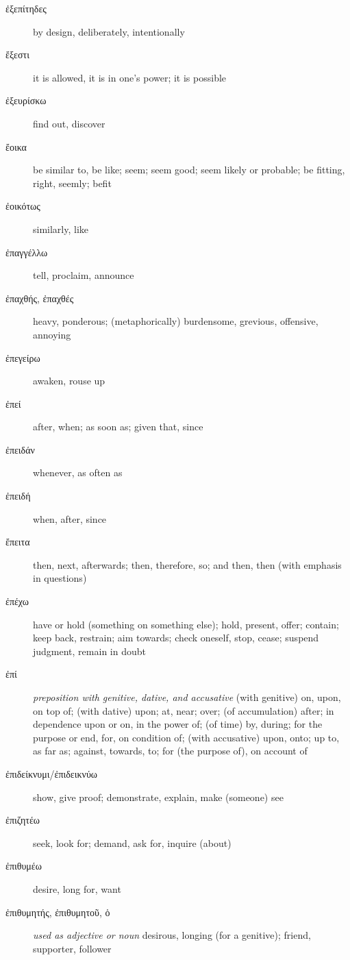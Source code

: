 \documentclass[12pt,letterpaper]{article}
\begin{document}
\begin{description}
    \item[\textgreek{ἐξεπίτηδες}] by design, deliberately, intentionally
    \item[\textgreek{ἔξεστι}] it is allowed, it is in one's power; it is possible
    \item[\textgreek{ἐξευρίσκω}] find out, discover
    \item[\textgreek{ἔοικα}] \marginnote{*}be similar to, be like; seem; seem good; seem likely or probable; be fitting, right, seemly; befit
    \item[\textgreek{ἐοικότως}] similarly, like
    \item[\textgreek{ἐπαγγέλλω}] tell, proclaim, announce
    \item[\textgreek{ἐπαχθής, ἐπαχθές}] heavy, ponderous; (metaphorically) burdensome, grevious, offensive, annoying
    \item[\textgreek{ἐπεγείρω}] awaken, rouse up
    \item[\textgreek{ἐπεί}] \marginnote{*}after, when; as soon as; given that, since
    \item[\textgreek{ἐπειδάν}] whenever, as often as
    \item[\textgreek{ἐπειδή}] when, after, since
    \item[\textgreek{ἔπειτα}] \marginnote{*}then, next, afterwards; then, therefore, so; and then, then (with emphasis in questions)
    \item[\textgreek{ἐπέχω}] have or hold (something on something else); hold, present, offer; contain; keep back, restrain; aim towards; check oneself, stop, cease; suspend judgment, remain in doubt
    \item[\textgreek{ἐπί}] \marginnote{*}\textit{preposition with genitive, dative, and accusative} (with genitive) on, upon, on top of; (with dative) upon; at, near; over; (of accumulation) after; in dependence upon or on, in the power of; (of time) by, during; for the purpose or end, for, on condition of; (with accusative) upon, onto; up to, as far as; against, towards, to; for (the purpose of), on account of
    \item[\textgreek{ἐπιδείκνυμι/ἐπιδεικνύω}] show, give proof; demonstrate, explain, make (someone) see
    \item[\textgreek{ἐπιζητέω}] seek, look for; demand, ask for, inquire (about)
    \item[\textgreek{ἐπιθυμέω}] desire, long for, want
    \item[\textgreek{ἐπιθυμητής, ἐπιθυμητοῦ, ὁ}] \textit{used as adjective or noun} desirous, longing (for a genitive); friend, supporter, follower

\end{description}
\end{document}

